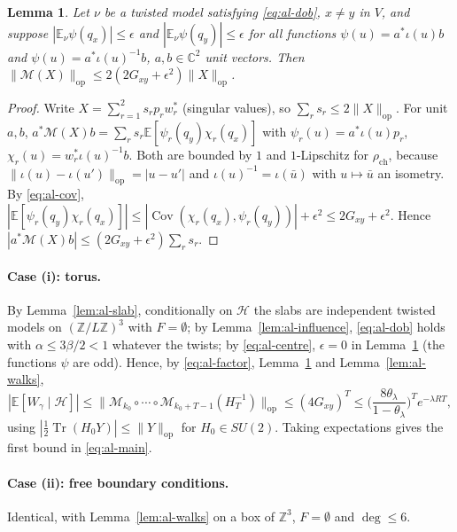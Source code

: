 \documentclass[11pt,a4paper]{article}
\theoremstyle{remark}
\theoremstyle{definition}
\theoremstyle{plain}
\newtheorem{allem}[althm]{Lemma}
\theoremstyle{remark}
\newcommand{\Z}{\mathbb{Z}}
\newcommand{\E}{\mathbb{E}}
\newcommand{\rch}{\rho_{\mathrm{ch}}}
\begin{document}
\begin{allem}\label{lem:al-M}
Let $\nu$ be a twisted model satisfying \eqref{eq:al-dob}, $x\ne y$ in $V$, and suppose $|\E_\nu\psi(q_x)|\le\epsilon$ and $|\E_\nu\psi(q_y)|\le\epsilon$ for all functions $\psi(u)=a^*\iota(u)b$ and $\psi(u)=a^*\iota(u)^{-1}b$, $a,b\in\mathbb C^2$ unit vectors. Then $\|\mathcal M(X)\|_{\mathrm{op}}\le2(2G_{xy}+\epsilon^2)\|X\|_{\mathrm{op}}$.
\end{allem}
\begin{proof}
Write $X=\sum_{r=1}^2s_rp_rw_r^*$ (singular values), so $\sum_rs_r\le2\|X\|_{\mathrm{op}}$. For unit $a,b$, $a^*\mathcal M(X)b=\sum_rs_r\E[\psi_r(q_y)\chi_r(q_x)]$ with $\psi_r(u)=a^*\iota(u)p_r$, $\chi_r(u)=w_r^*\iota(u)^{-1}b$. Both are bounded by $1$ and $1$-Lipschitz for $\rch$, because $\|\iota(u)-\iota(u')\|_{\mathrm{op}}=|u-u'|$ and $\iota(u)^{-1}=\iota(\bar u)$ with $u\mapsto\bar u$ an isometry. By \eqref{eq:al-cov}, $|\E[\psi_r(q_y)\chi_r(q_x)]|\le|\operatorname{Cov}(\chi_r(q_x),\psi_r(q_y))|+\epsilon^2\le2G_{xy}+\epsilon^2$. Hence $|a^*\mathcal M(X)b|\le(2G_{xy}+\epsilon^2)\sum_rs_r$.
\end{proof}

\paragraph{Case (i): torus.} By Lemma~\ref{lem:al-slab}, conditionally on $\mathcal H$ the slabs are independent twisted models on $(\Z/L\Z)^3$ with $F=\emptyset$; by Lemma~\ref{lem:al-influence}, \eqref{eq:al-dob} holds with $\alpha\le3\beta/2<1$ whatever the twists; by \eqref{eq:al-centre}, $\epsilon=0$ in Lemma~\ref{lem:al-M} (the functions $\psi$ are odd). Hence, by \eqref{eq:al-factor}, Lemma~\ref{lem:al-M} and Lemma~\ref{lem:al-walks},
\[
|\E[W_\gamma\mid\mathcal H]|\le\big\|\mathcal M_{k_0}\circ\cdots\circ\mathcal M_{k_0+T-1}(H_T^{-1})\big\|_{\mathrm{op}}\le(4G_{xy})^T\le\Big(\frac{8\theta_\lambda}{1-\theta_\lambda}\Big)^Te^{-\lambda RT},
\]
using $|\frac12\operatorname{Tr}(H_0Y)|\le\|Y\|_{\mathrm{op}}$ for $H_0\in SU(2)$. Taking expectations gives the first bound in \eqref{eq:al-main}.

\paragraph{Case (ii): free boundary conditions.} Identical, with Lemma~\ref{lem:al-walks} on a box of $\Z^3$, $F=\emptyset$ and $\deg\le6$.
\end{document}
